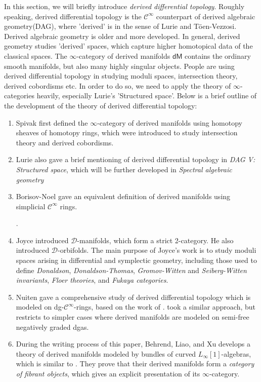 \documentclass[12pt]{amsart}
\theoremstyle{definition}
\theoremstyle{remark}
\numberwithin{equation}{section}
\newcommand{\cinf}{{\mathcal C}^{\infty}}
\newcommand{\1}{{\mathbb{1}}}
\newcommand{\dm}{\mathsf{dM}}
\begin{document}
In this section, we will briefly introduce {\it derived differential topology}. Roughly speaking, derived differential topology is the $\cinf$ counterpart of derived algebraic geometry(DAG), where 'derived' is in the sense of Lurie and T\"{o}en-Vezzosi. Derived algebraic geometry is older and more developed. In general, derived geometry studies 'derived' spaces, which capture higher homotopical data of the classical spaces. The $\infty$-category of derived manifolds $\dm$ contains the ordinary smooth manifolds, but also many highly singular objects. People are using derived differential topology in studying moduli spaces, intersection theory, derived cobordisms etc. In order to do so, we need to apply the theory of $\infty$-categories heavily, especially Lurie's 'Structured space'. Below is a brief outline of the development of the theory of derived differential topology:

\begin{enumerate}
	\item Spivak \cite{Spi08} first defined the $\infty$-category of derived manifolds using homotopy sheaves of homotopy rings, which were introduced to study intersection theory and derived cobordisms.
	
	\item Lurie \cite{Lur09a} also gave a brief mentioning of derived differential topology in {\it DAG V: Structured space}, which will be further developed in {\it Spectral algebraic geometry} \cite{Lur18}
	
	\item Borisov-Noel\cite{BN11} gave an equivalent definition of derived manifolds using simplicial $\cinf$ rings.
	
	
	.  
	\item Joyce \cite{Joy12} introduced $\mathcal{D}$-manifolds, which form a strict 2-category. He also introduced $\mathcal{D}$-orbifolds. The main purpose of Joyce's work is to study moduli spaces arising in differential and symplectic geometry, including those used to define {\it Donaldson}, {\it Donaldson-Thomas}, {\it Gromov-Witten} and {\it Seiberg-Witten invariants}, {\it Floer theories}, and {\it Fukaya categories}.
	
	\item Nuiten \cite{Nui18} gave a comprehensive study of derived differential topology which is modeled on dg-$\cinf$-rings, based on the work of \cite{CR12}. \cite{Pri20a} took a similar approach, but restricts to simpler cases where derived manifolds are modeled on semi-free negatively graded dgas.
	
	\item During the writing process of this paper, Behrend, Liao, and Xu \cite{BLX21} develops a theory of derived manifolds modeled by bundles of curved $L_{\infty}[1]$-algebras, which is similar to \cite{Pri20a}. They prove that their derived manifolds form a {\it category of fibrant objects}, which gives an explicit presentation of its $\infty$-category.
\end{enumerate}
\end{document}
